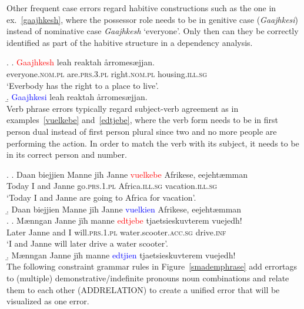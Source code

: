 \documentclass[free]{flammie}
\begin{document}
Other frequent case errors regard habitive constructions such as the one in
ex.~\ref{gaajhkesh}, where the possessor role needs to be in genitive case
(\textit{Gaajhkesi}) instead of nominative case \textit{Gaajhkesh} `everyone'.
Only then can they be correctly identified as part of the habitive structure in
a dependency analysis.

\ex.
\ag. \textcolor{red}{Gaajhkesh} leah reaktah årromesæjjan.\label{gaajhkesh}\\
everyone\textsc{.nom.pl} are\textsc{.prs.3.pl} right\textsc{.nom.pl} housing\textsc{.ill.sg}\\
`Everbody has the right to a place to live'.\\
\b. \textcolor{blue}{Gaajhkesi} leah reaktah årromesæjjan.\\

Verb phrase errors typically regard subject-verb agreement as in
examples~\ref{vuelkebe} and~\ref{edtjebe}, where the verb form needs to be in
first person dual instead of first person plural since two and no more people
are performing the action. In order to match the verb with its subject, it needs
to be in its correct person and number.

\ex.
\ag. Daan biejjien Manne jïh Janne \textcolor{red}{vuelkebe} Afrikese, eejehtæmman\label{vuelkebe}\\
Today I and Janne go\textsc{.prs.1.pl} Africa\textsc{.ill.sg} vacation\textsc{.ill.sg}\\
`Today I and Janne are going to Africa for vacation'.\\
\b. Daan biejjien Manne jïh Janne \textcolor{blue}{vuelkien} Afrikese, eejehtæmman\\


\ex.
\ag. Mænngan Janne jïh manne \textcolor{red}{edtjebe} tjaetsieskuvterem vuejedh!\label{edtjebe}\\
Later Janne and I will\textsc{.prs.1.pl} water.scooter\textsc{.acc.sg}  drive\textsc{.inf}\\
`I and Janne will later drive a water scooter'.\\
\b. Mænngan Janne jïh manne \textcolor{blue}{edtjien} tjaetsieskuvterem vuejedh!\\

The following constraint grammar rules in Figure~\ref{smademphrase} add
errortags to (multiple) demonstrative/indefinite pronouns noun combinations and
relate them to each other (ADDRELATION) to create a unified error that will be
visualized as one error.
\end{document}
